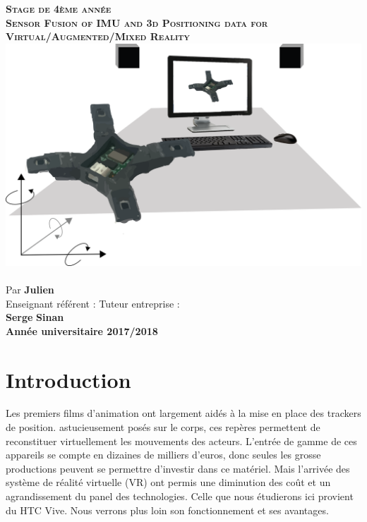 \documentclass[10pt]{report}
\begin{document}
\begin{titlepage}
\begin{sffamily}
\begin{center}
				\textsc{\huge \textbf{Stage de 4ème année}}\\[1cm]
				\textsc{\LARGE \textbf{Sensor Fusion of IMU and 3d Positioning data for Virtual/Augmented/Mixed Reality
			}}\\[2cm]
				\includegraphics[scale=0.2]{tracker.png}~\\[1cm]
				\Large Par \textbf{Julien }\\[1cm]		
				
				\Large Enseignant référent :                                       Tuteur entreprise :\\
				\textbf{Serge } 	\textbf{Sinan }\\
				
				
				
				\vfill		
				{\textbf{Année universitaire 2017/2018}}
				
			\end{center}
		\end{sffamily}
	\end{titlepage}	
	
	
	\renewcommand{\contentsname}{Sommaire}
	\tableofcontents
	
\chapter{Introduction}
Les premiers films d'animation ont largement aidés à la mise en place des trackers de position. astucieusement posés sur le corps, ces repères permettent de reconstituer virtuellement les mouvements des acteurs. L'entrée de gamme de ces appareils se compte en dizaines de milliers d'euros, donc seules les grosse productions peuvent se permettre d'investir dans ce matériel. Mais l'arrivée des système de réalité virtuelle (VR) ont permis une diminution des coût et un agrandissement du panel des technologies. Celle que nous étudierons ici provient du HTC Vive. Nous verrons plus loin son fonctionnement et ses avantages.\\
\end{document}

